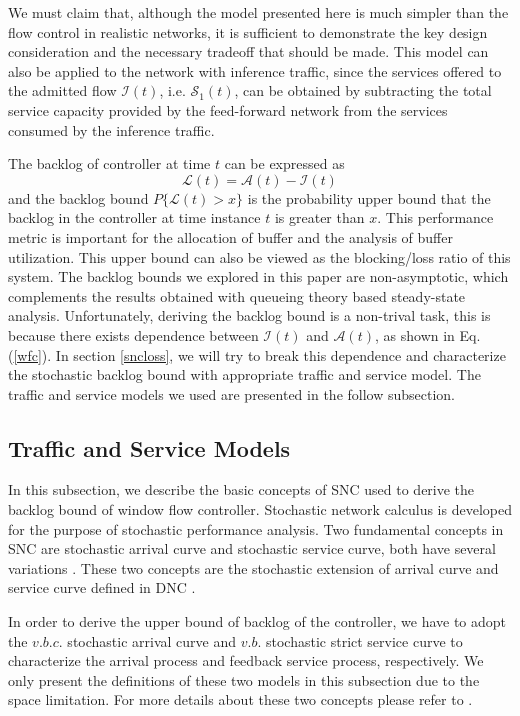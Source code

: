 \documentclass[12pt]{article}
\begin{document}
We must claim that, although the model presented here is much simpler than the flow control in realistic networks, it is sufficient to demonstrate the key design consideration and the necessary tradeoff that should be made. This model can also be applied to the network with inference traffic, since the services offered to the admitted flow $\mathcal{I}(t)$, i.e. $\mathcal{S}_1(t)$, can be obtained by subtracting the total service capacity provided by the feed-forward network from the services consumed by the inference traffic.

The backlog of controller at time $t$ can be expressed as $$\mathcal{L}(t)=\mathcal{A}(t)-\mathcal{I}(t)$$ and the backlog bound $P\{\mathcal{L}(t)>x\}$ is the probability upper bound that the backlog in the controller at time instance $t$ is greater than $x$. This performance metric is important for the allocation of buffer and the analysis of buffer utilization. This upper bound can also be viewed as the blocking/loss ratio of this system. The backlog bounds we explored in this paper are non-asymptotic, which complements the results obtained with queueing theory based steady-state analysis. Unfortunately, deriving the backlog bound is a non-trival task, this is because there exists dependence between $\mathcal{I}(t)$ and $\mathcal{A}(t)$, as shown in Eq.(\ref{wfc}). In section \ref{sncloss}, we will try to break this dependence and characterize the stochastic backlog bound with appropriate traffic and service model. The traffic and service models we used are presented in the follow subsection.

\subsection{Traffic and Service Models}\label{trafficservice}
In this subsection, we describe the basic concepts of SNC used to derive the backlog bound of window flow controller. Stochastic network calculus is developed for the purpose of stochastic performance analysis. Two fundamental concepts in SNC are stochastic arrival curve and stochastic service curve, both have several variations \cite{JiangLiu-15877,jiang2006basic}.
These two concepts are the stochastic extension of arrival curve and service curve defined in DNC \cite{Boudec2001Network}.

In order to derive the upper bound of backlog of the controller, we have to adopt the $v.b.c.$ stochastic arrival curve \cite{jiang2006basic,JiangLiu-15877} and $v.b.$ stochastic strict service curve \cite{Wu2010Model} to characterize the arrival process and feedback service process, respectively. We only present the definitions of these two models in this subsection due to the space limitation. For more details about these two concepts please refer to \cite{JiangLiu-15877,Wu2010Model,jiang2006basic}.
\end{document}
